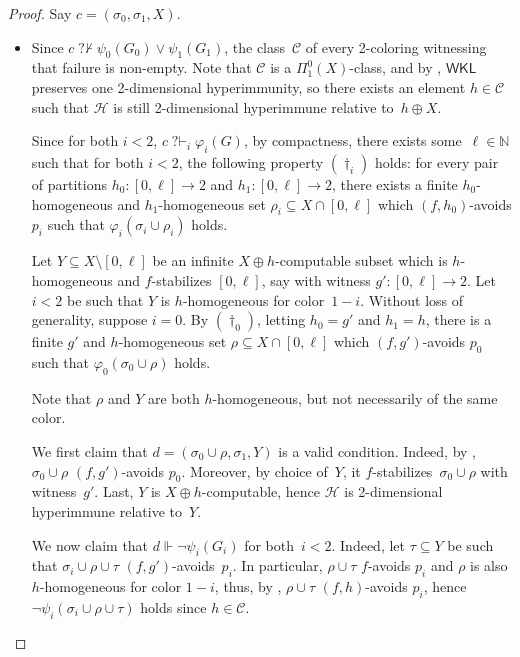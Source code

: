\documentclass{article}
\def\C{\mathcal{C}}
\def\Hc{\mathcal{H}}
\newcommand{\qvdash}{\operatorname{{?}{\vdash}}}
\newcommand{\nqvdash}{\operatorname{{?}{\nvdash}}}
\newcommand{\WKL}[0]{\mathsf{WKL}}
\newcommand{\NN}[0]{\mathbb{N}}
\def\NN{\mathbb{N}}
\def\C{\mathcal{C}}
\def\Hc{\mathcal{H}}
\numberwithin{theorem}{section}
\theoremstyle{definition}
\begin{document}
\begin{proof}
Say $c = (\sigma_0, \sigma_1, X)$.
\begin{itemize}
    \item  Since $c \nqvdash \psi_0(G_0) \lor \psi_1(G_1)$, the class~$\C$ of every 2-coloring witnessing that failure is non-empty. Note that $\C$ is a $\Pi_1^0(X)$-class, and by \cite[Corollary 2.7]{liu2022reverse}, $\WKL$ preserves one 2-dimensional hyperimmunity, so there exists an element $h \in \C$ such that $\Hc$ is still 2-dimensional hyperimmune relative to~$h \oplus X$. 

    Since for both $i<2$, $c \qvdash_i \varphi_i(G)$, by compactness, there exists some~$\ell \in \NN$ such that  for both $i<2$, the following property $(\dagger_i)$ holds: for every pair of partitions $h_0 : [0, \ell] \to 2$ and $h_1 : [0, \ell] \to 2$, there exists a finite $h_0$-homogeneous and $h_1$-homogeneous set $\rho_i \subseteq X \cap [0, \ell]$ which $(f,h_0)$-avoids $p_i$ such that $\varphi_i(\sigma_i \cup \rho_i)$ holds.
    
    Let $Y \subseteq X \setminus [0, \ell]$ be an infinite $X \oplus h$-computable subset which is $h$-homogeneous and $f$-stabilizes $[0, \ell]$, say with witness $g' : [0, \ell] \to 2$. 
    Let $i < 2$ be such that $Y$ is $h$-homogeneous for color~$1 -i$. Without loss of generality, suppose $i=0$. By $(\dagger_0)$, letting $h_0 = g'$ and $h_1 = h$, there is a finite $g'$ and $h$-homogeneous set $\rho \subseteq X \cap [0, \ell]$ which $(f,g')$-avoids $p_0$ such that $\varphi_0(\sigma_0 \cup \rho)$ holds.
    
    Note that $\rho$ and $Y$ are both $h$-homogeneous, but not necessarily of the same color.

    We first claim that $d = (\sigma_0 \cup \rho, \sigma_1, Y)$ is a valid condition. Indeed, by , $\sigma_0 \cup \rho$ $(f, g')$-avoids $p_0$. Moreover, by choice of~$Y$, it $f$-stabilizes~$\sigma_0 \cup \rho$ with witness~$g'$. Last, $Y$ is $X \oplus h$-computable, hence $\Hc$ is 2-dimensional hyperimmune relative to~$Y$.

    We now claim that $d \Vdash \neg \psi_i(G_i)$ for both~$i < 2$. Indeed, let $\tau \subseteq Y$ be such that $\sigma_i \cup \rho \cup \tau$ $(f, g')$-avoids~$p_i$. In particular, $\rho \cup \tau$ $f$-avoids $p_i$ and $\rho$ is also $h$-homogeneous for color $1-i$, thus, by , $\rho \cup \tau$ $(f, h)$-avoids $p_i$, hence $\neg \psi_i(\sigma_i \cup \rho \cup \tau)$ holds since  $h \in \C$.


\end{itemize}
\end{proof}
\end{document}
